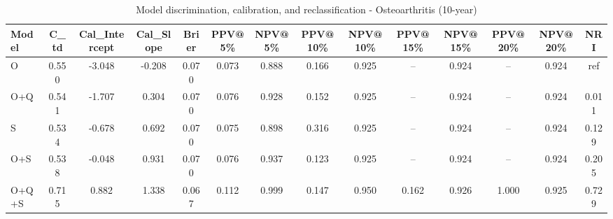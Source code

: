 \begin{table}[htbp]
\centering
\small
\caption{Model discrimination, calibration, and reclassification - Osteoarthritis (10-year)}
\label{tab:perf_osteoarthritis_10y}
\begin{tabular}{lccccccccccccc}
\toprule
Model & C\_td & Cal\_Intercept & Cal\_Slope & Brier & PPV@5\% & NPV@5\% & PPV@10\% & NPV@10\% & PPV@15\% & NPV@15\% & PPV@20\% & NPV@20\% & NRI \\
\midrule
O & 0.550 & -3.048 & -0.208 & 0.070 & 0.073 & 0.888 & 0.166 & 0.925 & -- & 0.924 & -- & 0.924 & ref \\
O+Q & 0.541 & -1.707 & 0.304 & 0.070 & 0.076 & 0.928 & 0.152 & 0.925 & -- & 0.924 & -- & 0.924 & 0.011 \\
S & 0.534 & -0.678 & 0.692 & 0.070 & 0.075 & 0.898 & 0.316 & 0.925 & -- & 0.924 & -- & 0.924 & 0.129 \\
O+S & 0.538 & -0.048 & 0.931 & 0.070 & 0.076 & 0.937 & 0.123 & 0.925 & -- & 0.924 & -- & 0.924 & 0.205 \\
O+Q+S & 0.715 & 0.882 & 1.338 & 0.067 & 0.112 & 0.999 & 0.147 & 0.950 & 0.162 & 0.926 & 1.000 & 0.925 & 0.729 \\
\bottomrule
\end{tabular}
\end{table}